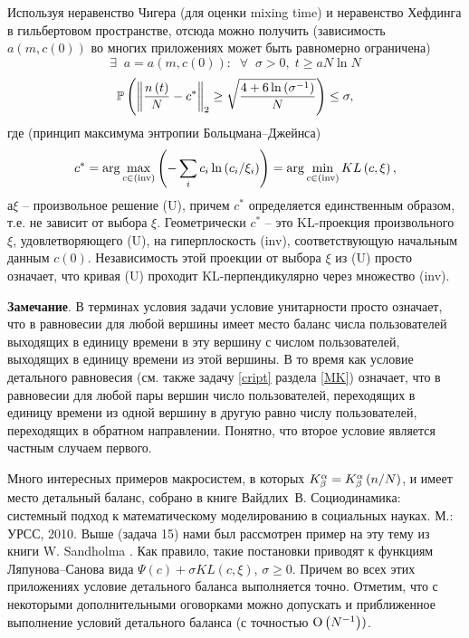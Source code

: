 \begin{remark}
Используя неравенство Чигера (для оценки mixing time) и неравенство Хефдинга в гильбертовом пространстве, отсюда можно получить (зависимость $a\left( {m,c\left( 0 \right)} \right)$ во многих приложениях может быть равномерно ограничена)
\[
\exists \;\;a=a\left( {m,c\left( 0 \right)} \right):\;\;\forall \;\;\sigma 
>0,\;t\ge aN\ln N 
\]
\[ \mathrm{{\mathbb P}}\left( {\left\| {\frac{n\left( t \right)}{N}-c^\ast } 
\right\|_2 \ge \sqrt {\frac{4+6\ln \left( {\sigma ^{-1}} \right)}{N}} } 
\right)\le \sigma ,
\]
где (принцип максимума энтропии Больцмана--Джейнса)
\[
c^\ast =\arg \mathop {\max }\limits_{ c \in \left( {\mbox{{\scriptsize inv}}} 
\right)} \left( {-\sum\limits_i {c_i } \ln \left( {{c_i } \mathord{\left/ 
{\vphantom {{c_i } {\xi _i }}} \right. \kern-\nulldelimiterspace} {\xi _i 
}} \right)} \right)=\arg \mathop {\min }\limits_{ c \in \left( 
{\mbox{{\scriptsize inv}}} \right)} KL\left( {c,\xi } \right),
\]
$а \xi $ -- произвольное решение (U), причем $c^\ast $  определяется единственным образом, т.е. не зависит от выбора $\xi $. Геометрически $c^\ast $ -- это KL-проекция произвольного $\xi $, удовлетворяющего (U), на гиперплоскость (inv), соответствующую начальным данным $c\left( 0 \right)$. Независимость этой проекции от выбора $\xi $ из (U) просто означает, что кривая (U) проходит KL-перпендикулярно через множество (inv).

\textbf{Замечание}. В терминах условия задачи условие унитарности просто 
означает, что в равновесии для любой вершины имеет место баланс числа 
пользователей выходящих в единицу времени в эту вершину с числом 
пользователей, выходящих в единицу времени из этой вершины. В то время как 
условие детального равновесия (см. также задачу \ref{cript} раздела \ref{MK}) 
означает, что в равновесии для любой пары вершин число пользователей, 
переходящих в единицу времени из одной вершину в другую равно числу 
пользователей, переходящих в обратном направлении. Понятно, что второе 
условие является частным случаем первого.

Много интересных 
примеров макросистем, в которых $K_\beta ^\alpha =K_\beta ^\alpha \left( {n 
\mathord{\left/ {\vphantom {n N}} \right. \kern-\nulldelimiterspace} N} 
\right)$, и имеет место детальный баланс, собрано в книге  Вайдлих~В. Социодинамика: 
системный подход к математическому моделированию в социальных науках. М.: 
УРСС, 2010. Выше (задача 15) нами был рассмотрен пример на эту тему из книги 
W. Sandholma \cite{222}. Как правило, такие постановки приводят к функциям 
Ляпунова--Санова вида $\Psi \left( c \right)+\sigma KL\left( {c,\xi } 
\right)$, $\sigma \ge 0$. Причем во всех этих приложениях условие детального 
баланса выполняется точно. Отметим, что с некоторыми дополнительными 
оговорками можно допускать и приближенное выполнение условий детального 
баланса (с точностью ${\rm O}\left( {N^{-1}} \right))$.


\end{remark}
